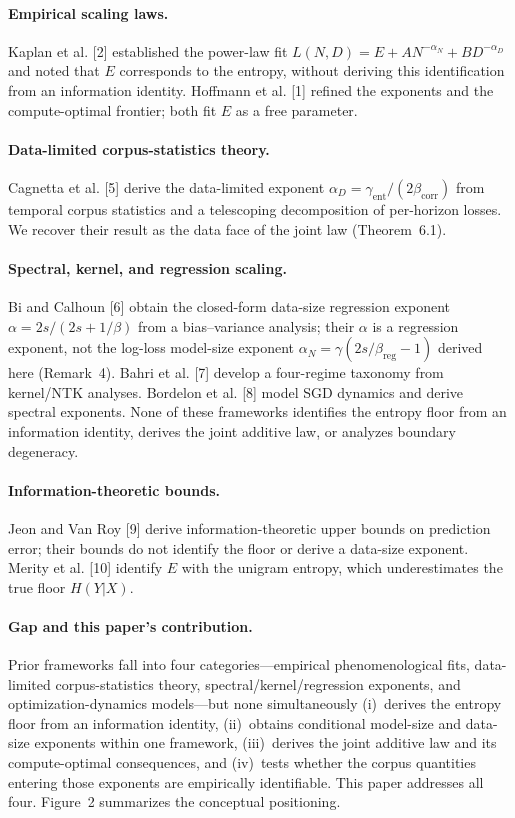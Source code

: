 \documentclass[12pt]{article}
\theoremstyle{remark}
\begin{document}
\paragraph{Empirical scaling laws.}
Kaplan et al. [2] established the power-law fit
$L(N,D)=E+AN^{-\alpha_N}+BD^{-\alpha_D}$ and noted that $E$ corresponds to
the entropy, without deriving this identification from an information identity.
Hoffmann et al. [1] refined the exponents and the compute-optimal frontier;
both fit $E$ as a free parameter.

\paragraph{Data-limited corpus-statistics theory.}
Cagnetta et al. [5] derive the data-limited exponent
$\alpha_D=\gamma_{\mathrm{ent}}/(2\beta_{\mathrm{corr}})$ from temporal corpus statistics
and a telescoping decomposition of per-horizon losses. We recover their result
as the data face of the joint law (Theorem~6.1).

\paragraph{Spectral, kernel, and regression scaling.}
Bi and Calhoun [6] obtain the closed-form data-size regression exponent
$\alpha=2s/(2s+1/\beta)$ from a bias--variance analysis; their $\alpha$ is a
regression exponent, not the log-loss model-size exponent
$\alpha_N=\gamma(2s/\beta_{\mathrm{reg}}-1)$ derived here
(Remark~4). Bahri et al. [7] develop a four-regime taxonomy
from kernel/NTK analyses. Bordelon et al. [8] model SGD dynamics and
derive spectral exponents. None of these frameworks identifies the entropy
floor from an information identity, derives the joint additive law, or
analyzes boundary degeneracy.

\paragraph{Information-theoretic bounds.}
Jeon and Van Roy [9] derive information-theoretic upper bounds on prediction
error; their bounds do not identify the floor or derive a data-size exponent.
Merity et al. [10] identify $E$ with the unigram entropy,
which underestimates the true floor $H(Y|X)$.

\paragraph{Gap and this paper's contribution.}
Prior frameworks fall into four categories---empirical phenomenological fits,
data-limited corpus-statistics theory, spectral/kernel/regression exponents,
and optimization-dynamics models---but none simultaneously (i)~derives the
entropy floor from an information identity, (ii)~obtains conditional
model-size and data-size exponents within one framework, (iii)~derives the
joint additive law and its compute-optimal consequences, and
(iv)~tests whether the corpus quantities entering those exponents are
empirically identifiable.  This paper addresses all four.
Figure~2 summarizes the conceptual positioning.
\end{document}
